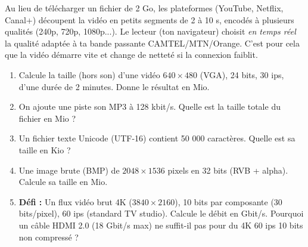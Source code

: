 \documentclass[11pt]{article}
\begin{document}
\begin{savaistu}
Au lieu de télécharger un fichier de 2 Go, les plateformes (YouTube, Netflix, Canal+) découpent la vidéo en petits segments de 2 à 10 s, encodés à plusieurs qualités (240p, 720p, 1080p...). Le lecteur (ton navigateur) choisit \emph{en temps réel} la qualité adaptée à ta bande passante CAMTEL/MTN/Orange. C'est pour cela que la vidéo démarre vite et change de netteté si la connexion faiblit.
\end{savaistu}

\begin{exercice}
\begin{enumerate}
  \item Calcule la taille (hors son) d'une vidéo $640 \times 480$ (VGA), 24 bits, 30 ips, d'une durée de 2 minutes. Donne le résultat en Mio.
  \item On ajoute une piste son MP3 à 128 kbit/s. Quelle est la taille totale du fichier en Mio ?
  \item Un fichier texte Unicode (UTF-16) contient 50 000 caractères. Quelle est sa taille en Kio ?
  \item Une image brute (BMP) de $2048 \times 1536$ pixels en 32 bits (RVB + alpha). Calcule sa taille en Mio.
  \item \textbf{Défi :} Un flux vidéo brut 4K ($3840 \times 2160$), 10 bits par composante (30 bits/pixel), 60 ips (standard TV studio). Calcule le débit en Gbit/s. Pourquoi un câble HDMI 2.0 (18 Gbit/s max) ne suffit-il pas pour du 4K 60 ips 10 bits non compressé ?
\end{enumerate}
\end{exercice}
\end{document}
